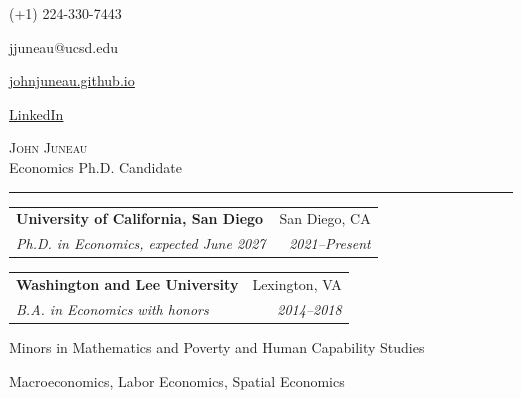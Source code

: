 \documentclass[a4paper,11pt]{article}
\makeatletter
\renewcommand{\sectionBlock}[2]{%
  \noindent
  \begin{minipage}[t]{2.45cm}
    \raggedright #1
  \end{minipage}%
  \hspace{0.5cm}%
  \begin{minipage}[t]{\dimexpr\linewidth-3.05cm\relax}
    \raggedright #2
  \end{minipage}
  \vspace{18pt}
}
\newcommand{\experienceHeading}[4]{%
  \begin{tabularx}{\linewidth}[t]{@{}Xr@{}}
    \textbf{#1} & #2 \\
    \textit{#3} & \textit{#4}
  \end{tabularx}\vspace{1pt}
}
\makeatother
\begin{document}
\begin{flushright}
  \item {\Calluna (+1) 224-330-7443}
  \item {\Calluna jjuneau@ucsd.edu}
  \item {\Calluna \href{https://johnjuneau.github.io}{\underline{johnjuneau.github.io}}}
  \item {\Calluna \href{https://www.linkedin.com/in/john-juneau-016022100/}{\underline{LinkedIn}}}
\end{flushright}\vspace{-58pt}

\begin{flushleft}
  {\Calluna \fontsize{30pt}{30pt}\selectfont \textsc{John Juneau}}\\[-1pt]
  {\CronosLt \fontsize{12.5pt}{14pt}\selectfont Economics Ph.D. Candidate}
  \noindent\rule{\textwidth}{0.4pt}
\end{flushleft}

\sectionBlock{
}{
\experienceHeading
  {University of California, San Diego}{San Diego, CA}
  {Ph.D. in Economics, expected June 2027}{2021--Present}
\vspace{6pt}

\experienceHeading
  {Washington and Lee University}{Lexington, VA}
  {B.A. in Economics with honors}{2014--2018}
\vspace{3pt}
Minors in Mathematics and Poverty and Human Capability Studies
}

\sectionBlock{
}{
Macroeconomics, Labor Economics, Spatial Economics
}
\end{document}
